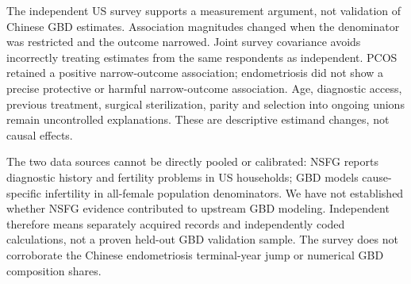 The independent US survey supports a measurement argument, not validation of Chinese GBD estimates. Association magnitudes changed when the denominator was restricted and the outcome narrowed. Joint survey covariance avoids incorrectly treating estimates from the same respondents as independent. PCOS retained a positive narrow-outcome association; endometriosis did not show a precise protective or harmful narrow-outcome association. Age, diagnostic access, previous treatment, surgical sterilization, parity and selection into ongoing unions remain uncontrolled explanations. These are descriptive estimand changes, not causal effects.

The two data sources cannot be directly pooled or calibrated: NSFG reports diagnostic history and fertility problems in US households; GBD models cause-specific infertility in all-female population denominators. We have not established whether NSFG evidence contributed to upstream GBD modeling. Independent therefore means separately acquired records and independently coded calculations, not a proven held-out GBD validation sample. The survey does not corroborate the Chinese endometriosis terminal-year jump or numerical GBD composition shares.
